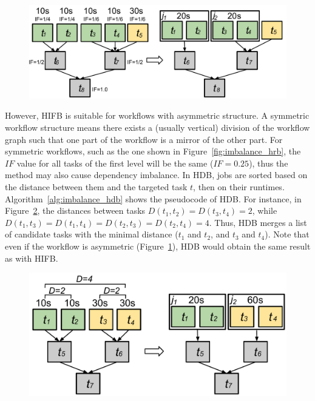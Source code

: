 \begin{figure}[htb]
	\centering
	\includegraphics[width=\linewidth]{figures/balance/figure9.pdf}
	\label{fig:imbalance_hifb}
\end{figure}

However, HIFB is suitable for workflows with asymmetric structure. A symmetric workflow structure means there exists a (usually vertical) division of the workflow graph such that one part of the workflow is a mirror of the other part. For symmetric workflows, such as the one shown in Figure~\ref{fig:imbalance_hrb}, the $IF$ value for all tasks of the first level will be the same ($IF=0.25$), thus the method may also cause dependency imbalance. In HDB, jobs are sorted based on the distance between them and the targeted task $t$, then on their runtimes. 
Algorithm~\ref{alg:imbalance_hdb} shows the pseudocode of HDB. 
For instance, in Figure~\ref{fig:imbalance_hdb}, the distances between tasks $D(t_1,t_2)=D(t_3,t_4)=2$, while $D(t_1,t_3)=D(t_1,t_4)=D(t_2,t_3)=D(t_2,t_4)=4$. Thus, HDB merges a list of candidate tasks with the minimal distance ($t_1$ and $t_2$, and $t_3$ and $t_4$). Note that even if the workflow is asymmetric (Figure~\ref{fig:imbalance_hifb}), HDB would obtain the same result as with HIFB. 

\begin{figure}[!htb]
	\centering
	\includegraphics[width=0.85\linewidth]{figures/balance/figure10.pdf}
	\label{fig:imbalance_hdb}
\end{figure}

